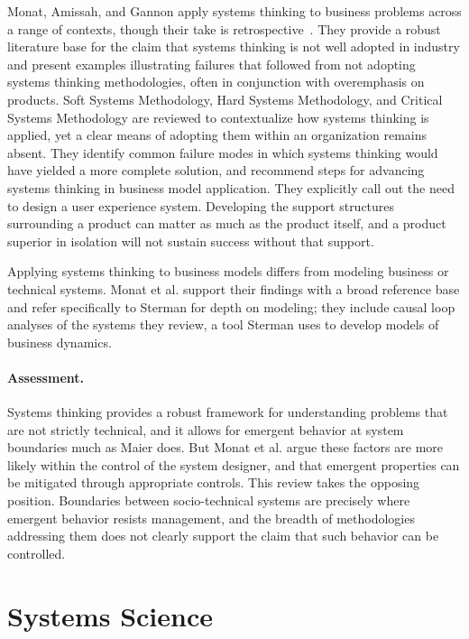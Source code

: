 \documentclass{csimq}
\begin{document}
Monat, Amissah, and Gannon apply systems thinking to business problems across a
range of contexts, though their take is retrospective~\cite{monat2020}.
They provide a robust literature base for the claim that systems thinking is not
well adopted in industry and present examples illustrating failures that
followed from not adopting systems thinking methodologies, often in conjunction
with overemphasis on products. Soft Systems Methodology, Hard Systems
Methodology, and Critical Systems Methodology are reviewed to contextualize how
systems thinking is applied, yet a clear means of adopting them within an
organization remains absent. They identify common failure modes in which systems
thinking would have yielded a more complete solution, and recommend steps for
advancing systems thinking in business model application. They explicitly call
out the need to design a user experience system. Developing the support
structures surrounding a product can matter as much as the product itself, and a
product superior in isolation will not sustain success without that support.

Applying systems thinking to business models differs from modeling business or
technical systems. Monat et al. support their findings with a broad reference
base and refer specifically to Sterman for depth on modeling; they include
causal loop analyses of the systems they review, a tool Sterman uses to develop
models of business dynamics.

\paragraph{Assessment.} Systems thinking provides a robust framework for
understanding problems that are not strictly technical, and it allows for
emergent behavior at system boundaries much as Maier does. But Monat et al.
argue these factors are more likely within the control of the system designer,
and that emergent properties can be mitigated through appropriate controls. This
review takes the opposing position. Boundaries between socio-technical systems
are precisely where emergent behavior resists management, and the breadth of
methodologies addressing them does not clearly support the claim that such
behavior can be controlled.

\section{Systems Science}
\label{sec:ss}
\end{document}
